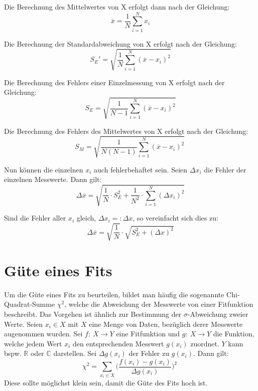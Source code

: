 Die Berechnung des Mittelwertes von X erfolgt dann nach der Gleichung:
\begin{equation}
    \overline{x} = \frac{1}{N} \sum_{i=1}^N x_i \label{eq:mittelwert}
\end{equation}

Die Berechnung der Standardabweichung von X erfolgt nach der Gleichung:
\begin{equation}
    S_E' = \sqrt{\frac{1}{N} \sum_{i=1}^N (\overline{x} - x_i)^2} \label{eq:standardabweichung}
\end{equation}

Die Berechnung des Fehlers einer Einzelmessung von X erfolgt nach der Gleichung:
\begin{equation}
    S_E = \sqrt{\frac{1}{N - 1} \sum_{i=1}^N (\overline{x} - x_i)^2} \label{eq:fehler_einzelmessung}
\end{equation}

Die Berechnung des Fehlers des Mittelwertes von X erfolgt nach der Gleichung:
\begin{equation}
    S_M = \sqrt{\frac{1}{N(N - 1)} \sum_{i=1}^N (\overline{x} - x_i)^2}~\label{eq:fehler_mittelwert}
\end{equation} 

Nun können die einzelnen $x_i$ auch fehlerbehaftet sein. Seien $\Delta x_i$ die Fehler der einzelnen Messwerte. Dann gilt:
\begin{equation}
    \Delta \overline{x} = \sqrt{\frac 1 N \cdot S_E^2 + \frac{1}{N^2} \cdot \sum_{i=1}^N (\Delta x_i)^2} \label{eq:fehler_messreihe_allg}
\end{equation}

Sind die Fehler aller $x_i$ gleich, $\Delta x_i =: \Delta x$, so vereinfacht sich dies zu:
\begin{equation}
    \Delta \overline{x} = \sqrt{\frac 1 N} \cdot \sqrt{S_E^2 + (\Delta x)^2} \label{eq:fehler_messreihe_einfach}
\end{equation}

\section{Güte eines Fits}
Um die Güte eines Fits zu beurteilen, bildet man häufig die sogenannte Chi-Quadrat-Summe $\chi^2$, welche die Abweichung der Messwerte von einer Fitfunktion beschreibt. Das Vorgehen ist ähnlich zur Bestimmung der $\sigma$-Abweichung zweier Werte. Seien $x_i \in X$ mit $X$ eine Menge von Daten, bezüglich derer Messwerte augenommen wurden. Sei $f:~X \rightarrow Y$ eine Fitfunktion und $g:~X \rightarrow Y$ die Funktion, welche jedem Wert $x_i$ den entsprechenden Messwert $g(x_i)$ zuordnet. $Y$ kann bspw. $\mathbb{R}$ oder $\mathbb{C}$ darstellen. Sei $\Delta g(x_i)$ der Fehler zu $g(x_i)$. Dann gilt:
\begin{equation}
    \chi^2 = \sum_{x_i \in X} \biggl(\frac{f(x_i) - g(x_i)}{\Delta g(x_i)}\biggr)^2~\label{eq:chisquare}
\end{equation}
Diese sollte möglichst klein sein, damit die Güte des Fits hoch ist.

